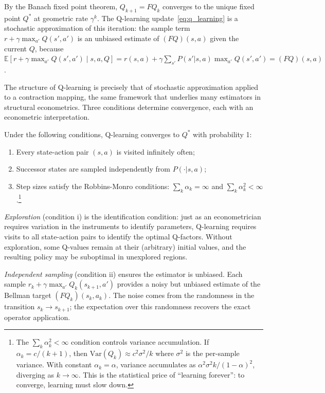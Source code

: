 By the Banach fixed point theorem, $Q_{k+1} = FQ_k$ converges to the unique fixed point $Q^*$ at geometric rate $\gamma^k$. The Q-learning update~\eqref{eq:q_learning} is a stochastic approximation of this iteration: the sample term $r + \gamma \max_{a'} Q(s',a')$ is an unbiased estimate of $(FQ)(s,a)$ given the current $Q$, because $\mathbb{E}[r + \gamma \max_{a'} Q(s',a') \mid s, a, Q] = r(s,a) + \gamma \sum_{s'} P(s'|s,a) \max_{a'} Q(s',a') = (FQ)(s,a)$.

The structure of Q-learning is precisely that of stochastic approximation applied to a contraction mapping, the same framework that underlies many estimators in structural econometrics. Three conditions determine convergence, each with an econometric interpretation.

\begin{theorem}
\label{thm:q_learning_convergence}
Under the following conditions, Q-learning converges to $Q^*$ with probability 1:
\begin{enumerate}
\item[(i)] Every state-action pair $(s,a)$ is visited infinitely often;
\item[(ii)] Successor states are sampled independently from $P(\cdot|s,a)$;
\item[(iii)] Step sizes satisfy the Robbins-Monro conditions: $\sum_k \alpha_k = \infty$ and $\sum_k \alpha_k^2 < \infty$.\footnote{The $\sum_k \alpha_k^2 < \infty$ condition controls variance accumulation. If $\alpha_k = c/(k+1)$, then $\text{Var}(Q_k) \approx c^2 \sigma^2 / k$ where $\sigma^2$ is the per-sample variance. With constant $\alpha_k = \alpha$, variance accumulates as $\alpha^2 \sigma^2 k / (1-\alpha)^2$, diverging as $k \to \infty$. This is the statistical price of ``learning forever'': to converge, learning must slow down.}
\end{enumerate}
\end{theorem}

\emph{Exploration} (condition i) is the identification condition: just as an econometrician requires variation in the instruments to identify parameters, Q-learning requires visits to all state-action pairs to identify the optimal Q-factors. Without exploration, some Q-values remain at their (arbitrary) initial values, and the resulting policy may be suboptimal in unexplored regions.

\emph{Independent sampling} (condition ii) ensures the estimator is unbiased. Each sample $r_k + \gamma \max_{a'} Q_k(s_{k+1}, a')$ provides a noisy but unbiased estimate of the Bellman target $(FQ_k)(s_k, a_k)$. The noise comes from the randomness in the transition $s_k \to s_{k+1}$; the expectation over this randomness recovers the exact operator application.

